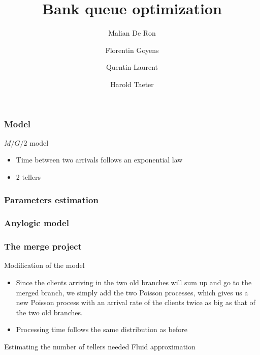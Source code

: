 \documentclass[10pt]{beamer}
\title{Bank queue optimization}
\author{
  Malian De Ron
  \and
  Florentin Goyens
  \and
  Quentin Laurent
  \and
  Harold Taeter
}
\begin{document}
\begin{frame}
  \maketitle
\end{frame}

\begin{frame}
  \frametitle{Model}
  \begin{block}{$M/G/2$ model}
  \begin{itemize}
    \item Time between two arrivals follows an exponential law
    \item 2 tellers
    \end{itemize}
  \end{block}
\end{frame}


\begin{frame}
  \frametitle{Parameters estimation}
 
  
\end{frame}

\begin{frame}
  \frametitle{Anylogic model}
  
\end{frame}

\begin{frame}
  \frametitle{The merge project}
  \begin{block}{Modification of the model}
  \begin{itemize}
  \item  Since the clients arriving in the two old branches will sum up and go to the merged branch, we simply add the two Poisson processes, which gives us a new Poisson process with an arrival rate of the clients twice as big as that of the two old branches.
  \item Processing time follows the same distribution as before
  \end{itemize}
  \end{block}
  
  \begin{block}{Estimating the number of tellers needed}
  Fluid approximation
  \end{block}
\end{frame}
\end{document}

